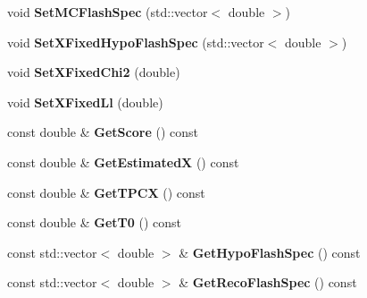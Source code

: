 \begin{DoxyCompactItemize}
\item 
\hypertarget{classubana_1_1FlashMatch_a0ba760ff15c8e7451a8c5a85d34e0e27}{void {\bfseries Set\-M\-C\-Flash\-Spec} (std\-::vector$<$ double $>$)}\label{classubana_1_1FlashMatch_a0ba760ff15c8e7451a8c5a85d34e0e27}

\item 
\hypertarget{classubana_1_1FlashMatch_a1773e321ebff8817365b2cb92585c377}{void {\bfseries Set\-X\-Fixed\-Hypo\-Flash\-Spec} (std\-::vector$<$ double $>$)}\label{classubana_1_1FlashMatch_a1773e321ebff8817365b2cb92585c377}

\item 
\hypertarget{classubana_1_1FlashMatch_a35ee14c73871353d049c507e6cee5194}{void {\bfseries Set\-X\-Fixed\-Chi2} (double)}\label{classubana_1_1FlashMatch_a35ee14c73871353d049c507e6cee5194}

\item 
\hypertarget{classubana_1_1FlashMatch_aab5f4c77216479d38f07ffaf8d23b607}{void {\bfseries Set\-X\-Fixed\-Ll} (double)}\label{classubana_1_1FlashMatch_aab5f4c77216479d38f07ffaf8d23b607}

\item 
\hypertarget{classubana_1_1FlashMatch_a9609a7e919011d3dca51e4d9aaeb96f0}{const double \& {\bfseries Get\-Score} () const }\label{classubana_1_1FlashMatch_a9609a7e919011d3dca51e4d9aaeb96f0}

\item 
\hypertarget{classubana_1_1FlashMatch_aa3d7773875587f0f0b3484436453e9eb}{const double \& {\bfseries Get\-Estimated\-X} () const }\label{classubana_1_1FlashMatch_aa3d7773875587f0f0b3484436453e9eb}

\item 
\hypertarget{classubana_1_1FlashMatch_a2f60d3ffbf76195a2daa7c607ae08c89}{const double \& {\bfseries Get\-T\-P\-C\-X} () const }\label{classubana_1_1FlashMatch_a2f60d3ffbf76195a2daa7c607ae08c89}

\item 
\hypertarget{classubana_1_1FlashMatch_a22f4fe66c3e9bdfc4e9e0ab8644f0d7e}{const double \& {\bfseries Get\-T0} () const }\label{classubana_1_1FlashMatch_a22f4fe66c3e9bdfc4e9e0ab8644f0d7e}

\item 
\hypertarget{classubana_1_1FlashMatch_a7d0f47481b725ba769cb13946d5320be}{const std\-::vector$<$ double $>$ \& {\bfseries Get\-Hypo\-Flash\-Spec} () const }\label{classubana_1_1FlashMatch_a7d0f47481b725ba769cb13946d5320be}

\item 
\hypertarget{classubana_1_1FlashMatch_ab9728fef08e709b602a3a2ba25c6c17c}{const std\-::vector$<$ double $>$ \& {\bfseries Get\-Reco\-Flash\-Spec} () const }\label{classubana_1_1FlashMatch_ab9728fef08e709b602a3a2ba25c6c17c}


\end{DoxyCompactItemize}
